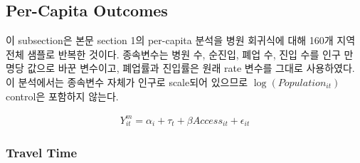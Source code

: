 \documentclass[a4paper, 10pt]{article}
\begin{document}
                \begin{table}[H]
                    \centering
                    \caption{All-Region Hospital Regression, KTX Within Two Hours: 병원}
                    
                \end{table}

                \begin{table}[H]
                    \centering
                    \caption{All-Region Hospital Regression, KTX Within Two Hours: 종합병원}
                    
                \end{table}

                \begin{table}[H]
                    \centering
                    \caption{All-Region Hospital Regression, KTX Within Two Hours: 상급종합병원}
                    
                \end{table}

        \subsection{Per-Capita Outcomes}
            이 subsection은 본문 section 1의 per-capita 분석을 병원 회귀식에 대해 160개 지역
            전체 샘플로 반복한 것이다. 종속변수는 병원 수, 순진입, 폐업 수, 진입 수를 인구
            만 명당 값으로 바꾼 변수이고, 폐업률과 진입률은 원래 rate 변수를 그대로 사용하였다.
            이 분석에서는 종속변수 자체가 인구로 scale되어 있으므로
            $\log(Population_{it})$ control은 포함하지 않는다.

            \begin{align*}
                Y^m_{it}
                =
                \alpha_i + \tau_t
                + \beta Access_{it}
                + \epsilon_{it}
            \end{align*}

            \subsubsection{Travel Time}
                \begin{table}[H]
                    \centering
                    \caption{All-Region Per-Capita Hospital Regression, Travel Time: 의원}
                    
                \end{table}
\end{document}
